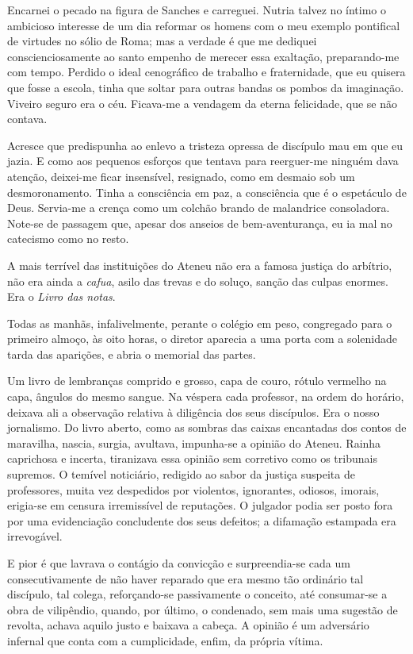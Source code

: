 Encarnei o pecado na figura de Sanches e carreguei. Nutria talvez no
íntimo o ambicioso interesse de um dia reformar os homens com o meu
exemplo pontifical de virtudes no sólio de Roma; mas a verdade é que me
dediquei conscienciosamente ao santo empenho de merecer essa exaltação,
preparando{}-me com tempo. Perdido o ideal cenográfico de trabalho e
fraternidade, que eu quisera que fosse a escola, tinha que soltar para
outras bandas os pombos da imaginação. Viveiro seguro era o céu.
Ficava{}-me a vendagem da eterna felicidade, que se não contava.

Acresce que predispunha ao enlevo a tristeza opressa de discípulo mau
em que eu jazia. E como aos pequenos esforços que tentava para
reerguer{}-me ninguém dava atenção, deixei{}-me ficar insensível,
resignado, como em desmaio sob um desmoronamento. Tinha a consciência
em paz, a consciência que é o espetáculo de Deus. Servia{}-me a crença
como um colchão brando de malandrice consoladora. Note{}-se de passagem
que, apesar dos anseios de bem{}-aventurança, eu ia mal no catecismo
como no resto. 

A mais terrível das instituições do Ateneu não era a
famosa justiça do arbítrio, não era ainda a \textit{cafua}, asilo das trevas e
do soluço, sanção das culpas enormes. Era o \textit{Livro das notas}. 

Todas as manhãs, infalivelmente, perante o colégio em peso, congregado para o
primeiro almoço, às oito horas, o diretor aparecia a uma porta com a
solenidade tarda das aparições, e abria o memorial
das partes. 

Um livro de lembranças comprido e grosso, capa de couro,
rótulo vermelho na capa, ângulos do mesmo sangue. Na véspera cada
professor, na ordem do horário, deixava ali a observação relativa à
diligência dos seus discípulos. Era o nosso jornalismo. Do livro
aberto, como as sombras das caixas encantadas dos contos de maravilha,
nascia, surgia, avultava, impunha{}-se a opinião do Ateneu. Rainha
caprichosa e incerta, tiranizava essa opinião sem corretivo como os
tribunais supremos. O temível noticiário, redigido ao sabor da justiça
suspeita de professores, muita vez despedidos por violentos,
ignorantes, odiosos, imorais, erigia{}-se em censura irremissível de
reputações. O julgador podia ser posto fora por uma evidenciação
concludente dos seus defeitos; a difamação estampada era irrevogável. 

E pior é que lavrava o contágio da convicção e surpreendia{}-se cada um
consecutivamente de não haver reparado que era mesmo tão ordinário tal
discípulo, tal colega, reforçando{}-se passivamente o conceito, até
consumar{}-se a obra de vilipêndio, quando, por último, o condenado,
sem mais uma sugestão de revolta, achava aquilo justo e baixava a
cabeça. A opinião é um adversário infernal que conta com a cumplicidade,
enfim, da própria vítima. 

